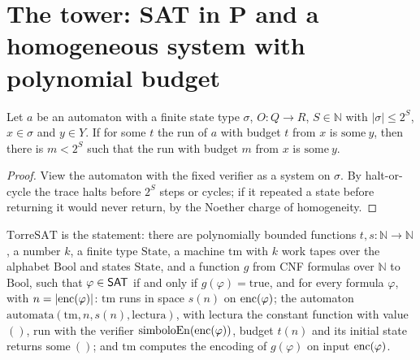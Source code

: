 \section{The tower: SAT in P and a homogeneous system with polynomial budget}
\label{sec:dynamics-tower}

\begin{theorem}
  \label{thm:dynamics-tower-time}
  \leanok
  Let $a$ be an automaton with a finite state type $\sigma$, $O : Q \to R$, $S \in \mathbb{N}$
  with $|\sigma| \le 2^S$, $x \in \sigma$ and $y \in Y$. If for some $t$ the run of $a$ with budget
  $t$ from $x$ is $\mathrm{some}\ y$, then there is $m < 2^S$ such that the run with budget $m$ from
  $x$ is $\mathrm{some}\ y$.
  \own{}
\end{theorem}

\begin{proof}
  \leanok
  View the automaton with the fixed verifier as a system on $\sigma$. By halt-or-cycle the trace
  halts before $2^S$ steps or cycles; if it repeated a state before returning it would never
  return, by the Noether charge of homogeneity.
\end{proof}

\begin{definition}
  \label{def:dynamics-tower-sat}
  \leanok
  $\mathrm{TorreSAT}$ is the statement: there are polynomially bounded functions $t, s :
  \mathbb{N} \to \mathbb{N}$, a number $k$, a finite type $\mathrm{State}$, a machine $\mathrm{tm}$
  with $k$ work tapes over the alphabet $\mathrm{Bool}$ and states $\mathrm{State}$, and a function
  $g$ from CNF formulas over $\mathbb{N}$ to $\mathrm{Bool}$, such that $\varphi \in \mathsf{SAT}$ if and
  only if $g(\varphi) = \mathrm{true}$, and for every formula $\varphi$, with $n = |\mathrm{enc}(\varphi)|$:
  $\mathrm{tm}$ runs in space $s(n)$ on $\mathrm{enc}(\varphi)$; the automaton
  $\mathrm{automata}(\mathrm{tm}, n, s(n), \mathrm{lectura})$, with $\mathrm{lectura}$ the constant function with value $()$, run with the verifier
  $\mathrm{simboloEn}(\mathrm{enc}(\varphi))$, budget $t(n)$ and its initial state returns
  $\mathrm{some}\ ()$; and $\mathrm{tm}$ computes the encoding of $g(\varphi)$ on input
  $\mathrm{enc}(\varphi)$.
  \own{}
\end{definition}


